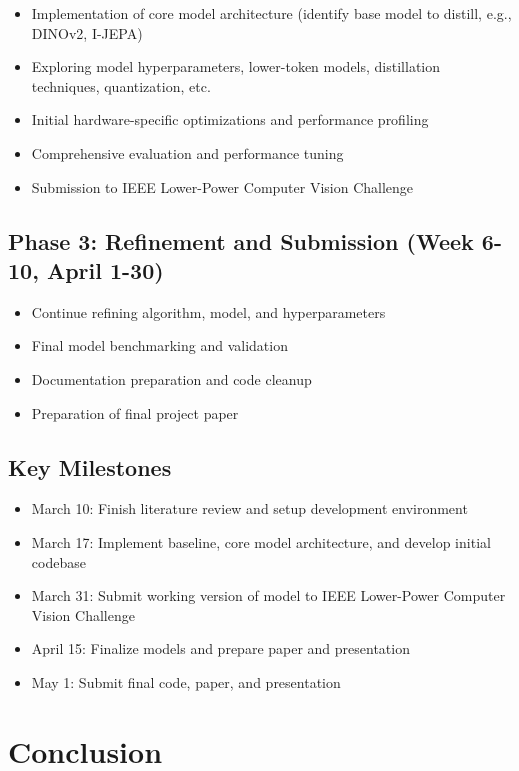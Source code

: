 \documentclass[11pt, oneside]{article}   	%
\begin{document}
\begin{itemize}
	\item Implementation of core model architecture (identify base model to distill, e.g., DINOv2, I-JEPA)
	\item Exploring model hyperparameters, lower-token models, distillation techniques, quantization, etc.
	\item Initial hardware-specific optimizations and performance profiling
	\item Comprehensive evaluation and performance tuning
	\item Submission to IEEE Lower-Power Computer Vision Challenge
\end{itemize}

\subsection*{Phase 3: Refinement and Submission (Week 6-10, April 1-30)}

\begin{itemize}
	\item Continue refining algorithm, model, and hyperparameters
	\item Final model benchmarking and validation
	\item Documentation preparation and code cleanup
	\item Preparation of final project paper
\end{itemize}

\subsection*{Key Milestones}

\begin{itemize}
	\item March 10: Finish literature review and setup development environment
	\item March 17: Implement baseline, core model architecture, and develop initial codebase
	\item March 31: Submit working version of model to IEEE Lower-Power Computer Vision Challenge
	\item April 15: Finalize models and prepare paper and presentation
	\item May 1: Submit final code, paper, and presentation
\end{itemize}

\section*{Conclusion}
\end{document}
